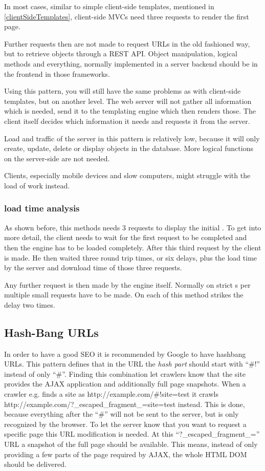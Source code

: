In most cases, similar to simple client-side templates, mentioned in \ref{clientSideTemplates}, client-side MVCs need three requests to render the first page.

Further requests then are not made to request URLs in the old fashioned way, but to retrieve objects through a REST API. 
Object manipulation, logical methods and everything, normally implemented in a server backend should be in the frontend in those frameworks.

Using this pattern, you will still have the same problems as with client-side templates, but on another level.
The web server will not gather all information which is needed, send it to the templating engine which then renders those.
The client itself decides which information it needs and requests it from the server.

Load and traffic of the server in this pattern is relatively low, because it will only create, update, delete or display objects in the database. 
More logical functions on the server-side are not needed.

Clients, especially mobile devices and slow computers, might struggle with the load of work instead.

\subsubsection{load time analysis}
As shown before, this methods needs 3 requests to display the initial \webPage{}.
To get into more detail, the client needs to wait for the first request to be completed and then the \ajax{} engine has to be loaded completely.
After this third request by the client is made.
He then waited three round trip times, or six delays, plus the load time by the server and download time of those three requests.

Any further request is then made by the \ajax{} engine itself.
Normally on strict \clientSideMVC{}s per \webPage{} multiple small requests have to be made.
On each of this method strikes the delay two times.
 

\subsection{Hash-Bang URLs}
In order to have a good SEO it is recommended by Google to have hashbang URLs.
This pattern defines that in the URL the \emph{hash part} should start with \enquote{\#!} instead of only \enquote{\#}.
Finding this combination let crawlers know that the site provides the AJAX application and additionally full page snapshots.
When a crawler e.g. finds a site as http://example.com/\#!site=test it crawls \newline http://example.com/?\_escaped\_fragment\_=site=test instead.
This is done, because everything after the \enquote{\#} will not be sent to the server, but is only recognized by the browser.
To let the server know that you want to request a specific page this URL modification is needed.
At this \enquote{?\_escaped\_fragment\_=} URL a snapshot of the full page should be available.
This means, instead of only providing a few parts of the page required by AJAX, the whole HTML DOM should be delivered.

